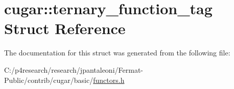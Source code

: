 \hypertarget{structcugar_1_1ternary__function__tag}{}\section{cugar\+:\+:ternary\+\_\+function\+\_\+tag Struct Reference}
\label{structcugar_1_1ternary__function__tag}


The documentation for this struct was generated from the following file\+:\begin{DoxyCompactItemize}
\item 
C\+:/p4research/research/jpantaleoni/\+Fermat-\/\+Public/contrib/cugar/basic/\hyperlink{functors_8h}{functors.\+h}\end{DoxyCompactItemize}
